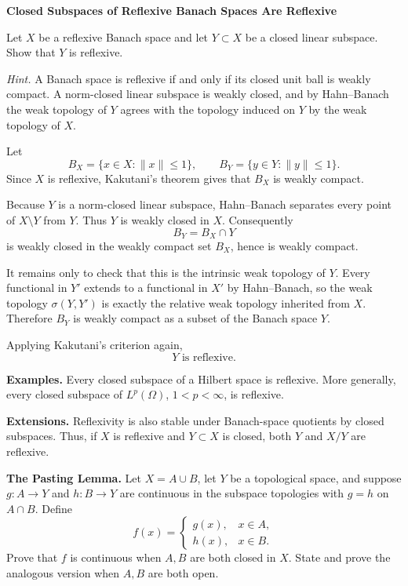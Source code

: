 \begin{problem}[CP-II-0395]
\label{prob:cp-ii-0395}
\textbf{Closed Subspaces of Reflexive Banach Spaces Are Reflexive}

\hspace*{1.5em}Let \(X\) be a reflexive Banach space and let \(Y\subset X\) be a closed
linear subspace. Show that \(Y\) is reflexive.

\medskip
\noindent\emph{Hint.} A Banach space is reflexive if and only if its closed unit ball is weakly
compact. A norm-closed linear subspace is weakly closed, and by Hahn--Banach
the weak topology of \(Y\) agrees with the topology induced on \(Y\) by the
weak topology of \(X\).
\end{problem}

\begin{solution}
Let
\[
B_X=\{x\in X:\|x\|\le1\},
\qquad
B_Y=\{y\in Y:\|y\|\le1\}.
\]
Since \(X\) is reflexive, Kakutani's theorem gives that \(B_X\) is weakly
compact.

Because \(Y\) is a norm-closed linear subspace, Hahn--Banach separates every
point of \(X\setminus Y\) from \(Y\). Thus \(Y\) is weakly closed in \(X\).
Consequently
\[
B_Y=B_X\cap Y
\]
is weakly closed in the weakly compact set \(B_X\), hence is weakly compact.

It remains only to check that this is the intrinsic weak topology of \(Y\).
Every functional in \(Y'\) extends to a functional in \(X'\) by Hahn--Banach,
so the weak topology \(\sigma(Y,Y')\) is exactly the relative weak topology
inherited from \(X\). Therefore \(B_Y\) is weakly compact as a subset of the
Banach space \(Y\).

Applying Kakutani's criterion again,
\[
\boxed{Y\text{ is reflexive}.}
\]

\medskip
\noindent\textbf{Examples.}
Every closed subspace of a Hilbert space is reflexive. More generally, every
closed subspace of \(L^p(\Omega)\), \(1<p<\infty\), is reflexive.

\medskip
\noindent\textbf{Extensions.}
Reflexivity is also stable under Banach-space quotients by closed subspaces.
Thus, if \(X\) is reflexive and \(Y\subset X\) is closed, both \(Y\) and
\(X/Y\) are reflexive.
\end{solution}


\begin{problem}[CP-II-0396]
\label{prob:cp-ii-0396}
\textbf{The Pasting Lemma.}
Let \(X=A\cup B\), let \(Y\) be a topological space, and suppose
\(g:A\to Y\) and \(h:B\to Y\) are continuous in the subspace topologies with
\(g=h\) on \(A\cap B\). Define
\[
f(x)=
\begin{cases}
g(x),&x\in A,\\
h(x),&x\in B.
\end{cases}
\]
Prove that \(f\) is continuous when \(A,B\) are both closed in \(X\).
State and prove the analogous version when \(A,B\) are both open.
\end{problem}

